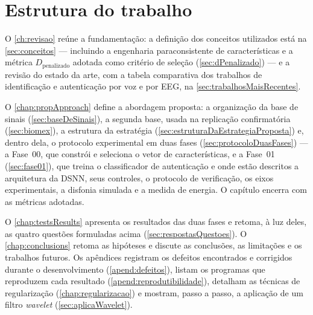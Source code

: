 	\section{Estrutura do trabalho}
			\par O \autoref{ch:revisao} reúne a fundamentação: a definição dos conceitos utilizados está na \autoref{sec:conceitos} --- incluindo a engenharia paraconsistente de características e a métrica $D_{\text{penalizado}}$ adotada como critério de seleção (\autoref{sec:dPenalizado}) --- e a revisão do estado da arte, com a tabela comparativa dos trabalhos de identificação e autenticação por voz e por \ac{EEG}, na \autoref{sec:trabalhosMaisRecentes}.

			\par O \autoref{chap:propApproach} define a abordagem proposta: a organização da base de sinais (\autoref{sec:baseDeSinais}), a segunda base, usada na replicação confirmatória (\autoref{sec:biomex}), a estrutura da estratégia (\autoref{sec:estruturaDaEstrategiaProposta}) e, dentro dela, o protocolo experimental em duas fases (\autoref{sec:protocoloDuasFases}) --- a Fase~00, que constrói e seleciona o vetor de características, e a Fase~01 (\autoref{sec:fase01}), que treina o classificador de autenticação e onde estão descritos a arquitetura da \ac{DSNN}, seus controles, o protocolo de verificação, os eixos experimentais, a disfonia simulada e a medida de energia. O capítulo encerra com as métricas adotadas.

			\par O \autoref{chap:testsResults} apresenta os resultados das duas fases e retoma, à luz deles, as quatro questões formuladas acima (\autoref{sec:respostasQuestoes}). O \autoref{chap:conclusions} retoma as hipóteses e discute as conclusões, as limitações e os trabalhos futuros. Os apêndices registram os defeitos encontrados e corrigidos durante o desenvolvimento (\autoref{apend:defeitos}), listam os programas que reproduzem cada resultado (\autoref{apend:reprodutibilidade}), detalham as técnicas de regularização (\autoref{chap:regularizacao}) e mostram, passo a passo, a aplicação de um filtro \textit{wavelet} (\autoref{sec:aplicaWavelet}).
